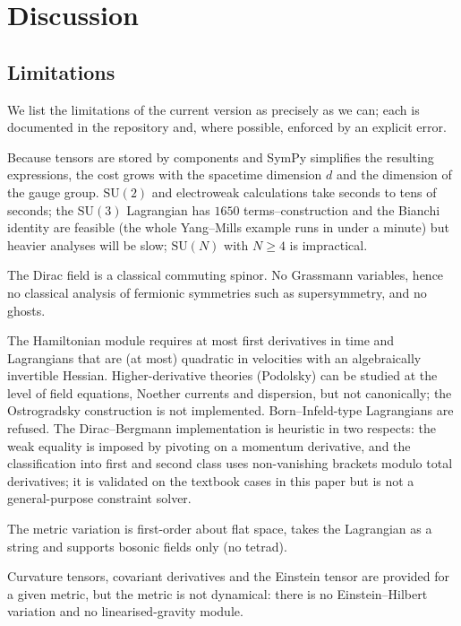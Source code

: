 \section{Discussion}
\label{sec:discussion}

\subsection{Limitations}
\label{sec:limits}

We list the limitations of the current version as precisely as we can; each is documented in the repository and, where possible, enforced by an explicit error.

\begin{description}[leftmargin=1.2em]
\item[Component-based cost.] Because tensors are stored by components and SymPy simplifies the resulting expressions, the cost grows with the spacetime dimension $d$ and the dimension of the gauge group. $\mathrm{SU}(2)$ and electroweak calculations take seconds to tens of seconds; the $\mathrm{SU}(3)$ Lagrangian has $1650$ terms--construction and the Bianchi identity are feasible (the whole Yang--Mills example runs in under a minute) but heavier analyses will be slow; $\mathrm{SU}(N)$ with $N\ge4$ is impractical.
\item[Classical, commuting fields.] The Dirac field is a classical commuting spinor. No Grassmann variables, hence no classical analysis of fermionic symmetries such as supersymmetry, and no ghosts.
\item[Canonical module.] The Hamiltonian module requires at most first derivatives in time and Lagrangians that are (at most) quadratic in velocities with an algebraically invertible Hessian. Higher-derivative theories (Podolsky) can be studied at the level of field equations, Noether currents and dispersion, but not canonically; the Ostrogradsky construction is not implemented. Born--Infeld-type Lagrangians are refused. The Dirac--Bergmann implementation is heuristic in two respects: the weak equality is imposed by pivoting on a momentum derivative, and the classification into first and second class uses non-vanishing brackets modulo total derivatives; it is validated on the textbook cases in this paper but is not a general-purpose constraint solver.
\item[Hilbert tensor.] The metric variation is first-order about flat space, takes the Lagrangian as a string and supports bosonic fields only (no tetrad).
\item[Gravity.] Curvature tensors, covariant derivatives and the Einstein tensor are provided for a given metric, but the metric is not dynamical: there is no Einstein--Hilbert variation and no linearised-gravity module.

\end{description}
